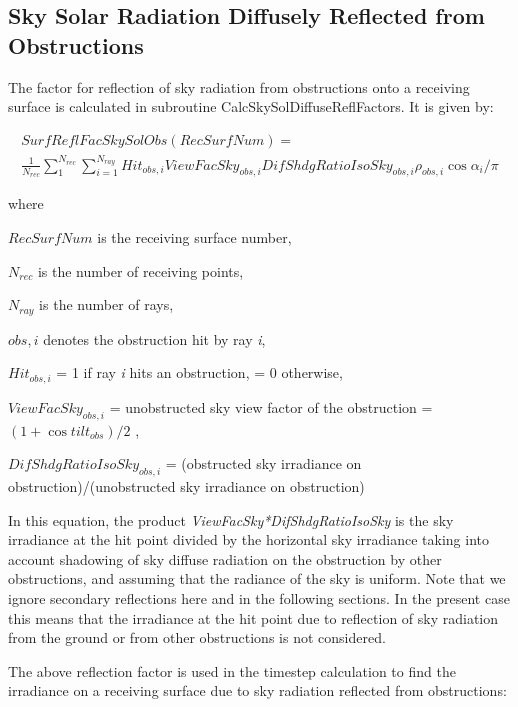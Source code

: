 \subsection{Sky Solar Radiation Diffusely Reflected from Obstructions}\label{sky-solar-radiation-diffusely-reflected-from-obstructions}

The factor for reflection of sky radiation from obstructions onto a receiving surface is calculated in subroutine CalcSkySolDiffuseReflFactors. It is given by:

\begin{equation}
\begin{array}{l}
{SurfReflFacSkySolObs(RecSurfNum)} = \\\frac{1}{{{N_{rec}}}}\sum\limits_1^{{N_{rec}}} {\sum\limits_{i = 1}^{{N_{ray}}} {Hi{t_{obs,i}}ViewFacSk{y_{obs,i}}DifShdgRatioIsoSk{y_{obs,i}}{\rho_{obs,i}}\cos {\alpha_i}/\pi } }
\end{array}
\end{equation}

where

\({RecSurfNum}\) is the receiving surface number,

\({N_{rec}}\) is the number of receiving points,

\({N_{ray}}\) is the number of rays,

\({obs,i}\) denotes the obstruction hit by ray \emph{i},

\({Hit_{obs,i}}\) = 1 if ray \emph{i} hits an obstruction, = 0 otherwise,

\({ViewFacSky_{obs,i}}\) = unobstructed sky view factor of the obstruction = \((1 + \cos til{t_{obs}})/2\) ,

\({DifShdgRatioIsoSky_{obs,i}}\) = (obstructed sky irradiance on obstruction)/(unobstructed sky irradiance on obstruction)

In this equation, the product \emph{ViewFacSky*DifShdgRatioIsoSky} is the sky irradiance at the hit point divided by the horizontal sky irradiance taking into account shadowing of sky diffuse radiation on the obstruction by other obstructions, and assuming that the radiance of the sky is uniform. Note that we ignore secondary reflections here and in the following sections. In the present case this means that the irradiance at the hit point due to reflection of sky radiation from the ground or from other obstructions is not considered.

The above reflection factor is used in the timestep calculation to find the irradiance on a receiving surface due to sky radiation reflected from obstructions:

